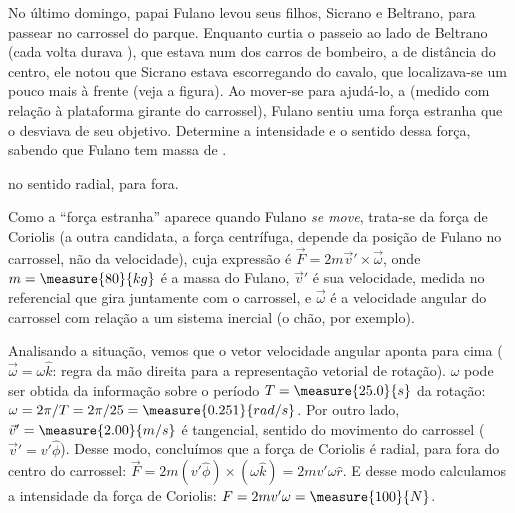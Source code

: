 \begin{question}
	No último domingo, papai Fulano levou seus filhos, Sicrano e Beltrano, para passear no carrossel do parque.
	Enquanto curtia o passeio ao lado de Beltrano (cada volta durava ), que estava num dos carros de bombeiro, a  de distância do centro, ele notou que Sicrano estava escorregando do cavalo, que localizava-se um pouco mais à frente (veja a figura).
	Ao mover-se para ajudá-lo, a  (medido com relação à plataforma girante do carrossel), Fulano sentiu uma força estranha que o desviava de seu objetivo.
	Determine a intensidade e o sentido dessa força, sabendo que Fulano tem massa de .


	\begin{answer}
		 no sentido radial, para fora.
	\end{answer}

	\begin{solution}
		Como a ``força estranha'' aparece quando Fulano \emph{se move}, trata-se da força de Coriolis (a outra candidata, a força centrífuga, depende da posição de Fulano no carrossel, não da velocidade), cuja expressão é $\vec F = 2m\vec v' \times \vec \omega$, onde $m = \measure{80}{kg}$ é a massa do Fulano, $\vec v'$ é sua velocidade, medida no referencial que gira juntamente com o carrossel, e $\vec\omega$ é a velocidade angular do carrossel com relação a um sistema inercial (o chão, por exemplo).

		Analisando a situação, vemos que o vetor velocidade angular aponta para cima ($\vec\omega = \omega\hat k$: regra da mão direita para a representação vetorial de rotação). $\omega$ pode ser obtida da informação sobre o período $T = \measure{25.0}{s}$ da rotação: $\omega = 2\pi/T = 2\pi/25 = \measure{0.251}{rad/s}$. Por outro lado, $\vec v' = \measure{2.00}{m/s}$ é tangencial, sentido do movimento do carrossel ($\vec v' = v'\hat \phi$).
		Desse modo, concluímos que a força de Coriolis é radial, para fora do centro do carrossel: $\vec F = 2m(v'\hat \phi)\times(\omega \hat k) = 2mv'\omega \hat r$. E desse modo calculamos a intensidade da força de Coriolis: $F = 2mv'\omega = \measure{100}{N}$.
	\end{solution}
\end{question}